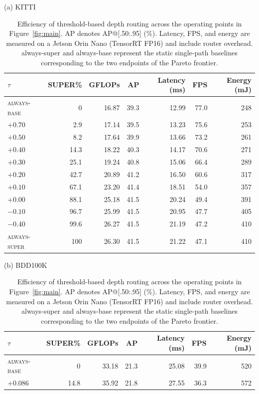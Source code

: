 \begin{table}[!t]
\caption{
    Efficiency of threshold-based depth routing across the operating points in Figure~\ref{fig:main}.
    AP denotes AP@[.50:.95] (\%).
    Latency, FPS, and energy are measured on a Jetson Orin Nano (TensorRT FP16) and include router overhead.
    always-super and always-base represent the static single-path baselines corresponding to the two endpoints of the Pareto frontier.
}
\label{tab:main}
\small
\setlength{\tabcolsep}{2.5pt}
\centering
\begin{minipage}[t]{0.49\textwidth}
\centering
{\small (a) KITTI}\\[2pt]
\footnotesize
\begin{tabular}{lrrrrrr}
\toprule
$\tau$ & SUPER\% & GFLOPs & AP & Latency (ms) & FPS & Energy (mJ)\\
\midrule
\textsc{always-base} & 0 & 16.87 & 39.3 & 12.99 & 77.0 & 248\\
$+0.70$ & 2.9 & 17.14 & 39.5 & 13.23 & 75.6 & 253\\
$+0.50$ & 8.2 & 17.64 & 39.9 & 13.66 & 73.2 & 261\\
$+0.40$ & 14.3 & 18.22 & 40.3 & 14.17 & 70.6 & 271\\
$+0.30$ & 25.1 & 19.24 & 40.8 & 15.06 & 66.4 & 289\\
$+0.20$ & 42.7 & 20.89 & 41.2 & 16.50 & 60.6 & 317\\
$+0.10$ & 67.1 & 23.20 & 41.4 & 18.51 & 54.0 & 357\\
$+0.00$ & 88.1 & 25.18 & 41.5 & 20.24 & 49.4 & 391\\
$-0.10$ & 96.7 & 25.99 & 41.5 & 20.95 & 47.7 & 405\\
$-0.40$ & 99.6 & 26.27 & 41.5 & 21.19 & 47.2 & 410\\
\textsc{always-super} & 100 & 26.30 & 41.5 & 21.22 & 47.1 & 410\\
\bottomrule
\end{tabular}
\end{minipage}\hfill
\begin{minipage}[t]{0.49\textwidth}
\centering
{\small (b) BDD100K}\\[2pt]
\footnotesize
\begin{tabular}{lrrrrrr}
\toprule
$\tau$ & SUPER\% & GFLOPs & AP & Latency (ms) & FPS & Energy (mJ)\\
\midrule
\textsc{always-base} & 0 & 33.18 & 21.3 & 25.08 & 39.9 & 520\\
$+0.086$ & 14.8 & 35.92 & 21.8 & 27.55 & 36.3 & 572\\

\end{tabular}
\end{minipage}
\end{table}
